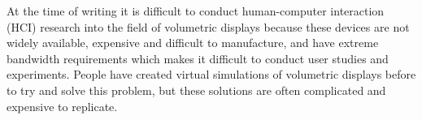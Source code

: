 \begin{invisBox}
\hfill
{}
\end{invisBox}

At the time of writing it is difficult to conduct human-computer interaction (HCI) research into the field of volumetric displays because these devices are not widely available, expensive and difficult to manufacture, and have extreme bandwidth requirements which makes it difficult to conduct user studies and experiments. People have created virtual simulations of volumetric displays before to try and solve this problem, but these solutions are often complicated and expensive to replicate.


